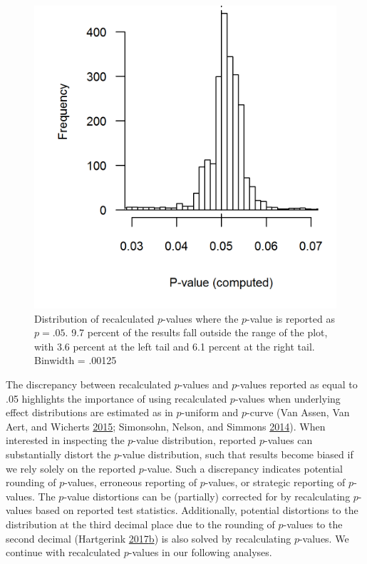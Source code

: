 \documentclass[a5paper]{book}
\begin{document}
\begin{figure}[h]

{\centering \includegraphics[width=13.89in]{assets/figures/bump-fig3} 

}

\caption{Distribution of recalculated $p$-values where the $p$-value is reported as $p=.05$. 9.7 percent of the results fall outside the range of the plot, with 3.6 percent at the left tail and 6.1 percent at the right tail. Binwidth = .00125}\label{fig:bump-fig3}
\end{figure}

The discrepancy between recalculated \(p\)-values and \(p\)-values
reported as equal to .05 highlights the importance of using recalculated
\(p\)-values when underlying effect distributions are estimated as in
\(p\)-uniform and \(p\)-curve (Van Assen, Van Aert, and Wicherts
\protect\hyperlink{ref-doi:10.1037ux2fmet0000025}{2015}; Simonsohn,
Nelson, and Simmons
\protect\hyperlink{ref-doi:10.1037ux2fa0033242}{2014}). When interested
in inspecting the \(p\)-value distribution, reported \(p\)-values can
substantially distort the \(p\)-value distribution, such that results
become biased if we rely solely on the reported \(p\)-value. Such a
discrepancy indicates potential rounding of \(p\)-values, erroneous
reporting of \(p\)-values, or strategic reporting of \(p\)-values. The
\(p\)-value distortions can be (partially) corrected for by
recalculating \(p\)-values based on reported test statistics.
Additionally, potential distortions to the distribution at the third
decimal place due to the rounding of \(p\)-values to the second decimal
(Hartgerink
\protect\hyperlink{ref-doi:10.7717ux2fpeerj.3068}{2017}\protect\hyperlink{ref-doi:10.7717ux2fpeerj.3068}{b})
is also solved by recalculating \(p\)-values. We continue with
recalculated \(p\)-values in our following analyses.
\end{document}
